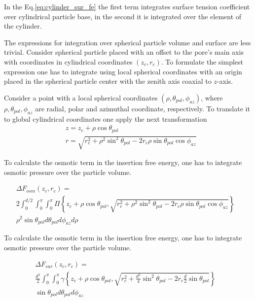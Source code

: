\documentclass[12pt, a4paper]{article}
\begin{document}
In the Eq.\ref{eq:cylinder_sur_fe} the first term integrates surface tension coefficient over cylindrical particle base, in the second it is integrated over the element of the cylinder.

The expressions for integration over spherical particle volume and surface are less trivial.
Consider spherical particle placed with an offset to the pore's main axis with coordinates in cylindrical coordinates $(z_c, r_c)$.
To formulate the simplest expression one has to integrate using local spherical coordinates with an origin placed in the spherical particle center with the zenith axis coaxial to $z$-axis.

Consider a point with a local spherical coordinates $(\rho, \theta_{pol}, \phi_{az})$, where $\rho, \theta_{pol}, \phi_{az}$ are radial, polar and azimuthal coordinate, respectively.
To translate it to global cylindrical coordinates one apply the next transformation 
\begin{align}
    &z=z_c + \rho \cos \theta_{pol}
    \\
    &r=\sqrt{r_c^2 + \rho^2 \sin^2 \theta_{pol} - 2 r_c \rho \sin \theta_{pol} \cos \phi_{az}}
\end{align} 

To calculate the osmotic term in the insertion free energy, one has to integrate osmotic pressure over the particle volume.

\begin{equation}
    \label{eq:sphere_osm_fe}
    \begin{aligned}
        \Delta F_{osm}(z_c, r_c) =&
        \\ 
        2 \int_{0}^{d/2} \int_{0}^{\pi} \int_{0}^{\pi} \Pi \left\{ z_c + \rho \cos \theta_{pol}, \sqrt{r_c^2 + \rho^2 \sin^2 \theta_{pol} - 2 r_c \rho \sin \theta_{pol} \cos \phi_{az}} \right\}
        \\
        \rho^2 \sin\theta_{pol} d\theta_{pol} d\phi_{az} d\rho&
    \end{aligned}
\end{equation}

To calculate the osmotic term in the insertion free energy, one has to integrate osmotic pressure over the particle volume.

\begin{equation}
    \label{eq:sphere_sur_fe}
    \begin{aligned}
    \Delta F_{sur}(z_c, r_c) =&
    \\
    \frac{d^2}{2} \int_{0}^{\pi} \int_{0}^{\pi} \gamma \left\{ z_c + \rho \cos \theta_{pol}, \sqrt{r_c^2 + \frac{d^2}{4} \sin^2 \theta_{pol} - 2 r_c \frac{d}{2} \sin \theta_{pol}} \right\} &
    \\
    \sin \theta_{pol} d\theta_{pol} d\phi_{az}&
    \end{aligned}
\end{equation}
\end{document}
